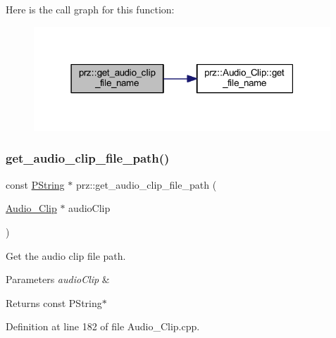Here is the call graph for this function\+:
\nopagebreak
\begin{figure}[H]
\begin{center}
\leavevmode
\includegraphics[width=316pt]{namespaceprz_a1e806a9ab1fe1af94256d0e0efccd999_cgraph}
\end{center}
\end{figure}
\mbox{\label{namespaceprz_a1e56bb34b7529aa4bebbc720221ab7c8}} 
\subsubsection{\texorpdfstring{get\_audio\_clip\_file\_path()}{get\_audio\_clip\_file\_path()}}
{\footnotesize\ttfamily const \mbox{\hyperlink{classprz_1_1_p_string}{P\+String}} $\ast$ prz\+::get\+\_\+audio\+\_\+clip\+\_\+file\+\_\+path (\begin{DoxyParamCaption}\item[{\mbox{\hyperlink{classprz_1_1_audio___clip}{Audio\+\_\+\+Clip}} $\ast$}]{audio\+Clip }\end{DoxyParamCaption})}



Get the audio clip file path. 


\begin{DoxyParams}{Parameters}
{\em audio\+Clip} & \\
\hline
\end{DoxyParams}
\begin{DoxyReturn}{Returns}
const P\+String$\ast$ 
\end{DoxyReturn}


Definition at line 182 of file Audio\+\_\+\+Clip.\+cpp.

